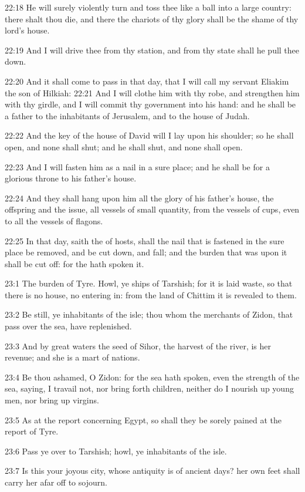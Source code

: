22:18 He will surely violently turn and toss thee like a ball into a
large country: there shalt thou die, and there the chariots of thy
glory shall be the shame of thy lord's house.

22:19 And I will drive thee from thy station, and from thy state shall
he pull thee down.

22:20 And it shall come to pass in that day, that I will call my
servant Eliakim the son of Hilkiah: 22:21 And I will clothe him with
thy robe, and strengthen him with thy girdle, and I will commit thy
government into his hand: and he shall be a father to the inhabitants
of Jerusalem, and to the house of Judah.

22:22 And the key of the house of David will I lay upon his shoulder;
so he shall open, and none shall shut; and he shall shut, and none
shall open.

22:23 And I will fasten him as a nail in a sure place; and he shall be
for a glorious throne to his father's house.

22:24 And they shall hang upon him all the glory of his father's
house, the offspring and the issue, all vessels of small quantity,
from the vessels of cups, even to all the vessels of flagons.

22:25 In that day, saith the \LORD of hosts, shall the nail that is
fastened in the sure place be removed, and be cut down, and fall; and
the burden that was upon it shall be cut off: for the \LORD hath spoken
it.

23:1 The burden of Tyre. Howl, ye ships of Tarshish; for it is laid
waste, so that there is no house, no entering in: from the land of
Chittim it is revealed to them.

23:2 Be still, ye inhabitants of the isle; thou whom the merchants of
Zidon, that pass over the sea, have replenished.

23:3 And by great waters the seed of Sihor, the harvest of the river,
is her revenue; and she is a mart of nations.

23:4 Be thou ashamed, O Zidon: for the sea hath spoken, even the
strength of the sea, saying, I travail not, nor bring forth children,
neither do I nourish up young men, nor bring up virgins.

23:5 As at the report concerning Egypt, so shall they be sorely pained
at the report of Tyre.

23:6 Pass ye over to Tarshish; howl, ye inhabitants of the isle.

23:7 Is this your joyous city, whose antiquity is of ancient days? her
own feet shall carry her afar off to sojourn.

